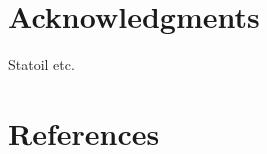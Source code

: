 \documentclass[12pt,a4paper,final]{iopart}
\begin{document}
\section{Acknowledgments}
Statoil etc.

\section*{References}


%


\end{document}
